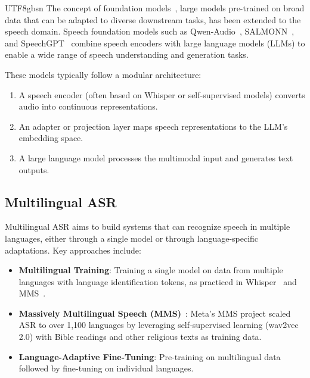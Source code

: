 \documentclass[12pt,a4paper]{article}
\begin{document}
\begin{CJK}{UTF8}{gbsn}
The concept of foundation models~\cite{bommasani2021opportunities}, large models pre-trained on broad data that can be adapted to diverse downstream tasks, has been extended to the speech domain. Speech foundation models such as Qwen-Audio~\cite{chu2023qwen}, SALMONN~\cite{tang2023salmonn}, and SpeechGPT~\cite{zhang2023speechgpt} combine speech encoders with large language models (LLMs) to enable a wide range of speech understanding and generation tasks.

These models typically follow a modular architecture:
\begin{enumerate}[leftmargin=*]
    \item A speech encoder (often based on Whisper or self-supervised models) converts audio into continuous representations.
    \item An adapter or projection layer maps speech representations to the LLM's embedding space.
    \item A large language model processes the multimodal input and generates text outputs.
\end{enumerate}

\subsection{Multilingual ASR}
\label{subsec:multilingual}

Multilingual ASR aims to build systems that can recognize speech in multiple languages, either through a single model or through language-specific adaptations. Key approaches include:

\begin{itemize}[leftmargin=*]
    \item \textbf{Multilingual Training}: Training a single model on data from multiple languages with language identification tokens, as practiced in Whisper~\cite{radford2023robust} and MMS~\cite{pratap2023scaling}.
    \item \textbf{Massively Multilingual Speech (MMS)}~\cite{pratap2023scaling}: Meta's MMS project scaled ASR to over 1,100 languages by leveraging self-supervised learning (wav2vec 2.0) with Bible readings and other religious texts as training data.
    \item \textbf{Language-Adaptive Fine-Tuning}: Pre-training on multilingual data followed by fine-tuning on individual languages.
\end{itemize}


\end{CJK}
\end{document}
